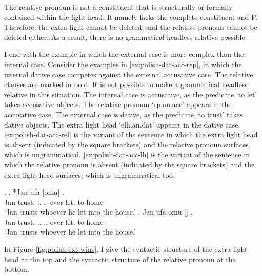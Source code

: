 The relative pronoun is not a constituent that is structurally or formally contained within the light head. It namely lacks the complete constituent and P.
Therefore, the extra light cannot be deleted, and the relative pronoun cannot be deleted either.
As a result, there is no grammatical headless relative possible.

I end with the example in which the external case is more complex than the internal case.
Consider the examples in \ref{ex:polish-dat-acc-rep}, in which the internal dative case competes against the external accusative case. The relative clauses are marked in bold. It is not possible to make a grammatical headless relative in this situation.
The internal case is accusative, as the predicate  `to let' takes accusative objects. The relative pronoun  `\ac{rp}.\ac{an}.\ac{acc}' appears in the accusative case.
The external case is dative, as the predicate  `to trust' takes dative objects. The extra light head  `\ac{elh}.\ac{an}.\ac{dat}' appears in the dative case.
\ref{ex:polish-dat-acc-rel} is the variant of the sentence in which the extra light head is absent (indicated by the square brackets) and the relative pronoun surfaces, which is ungrammatical.
\ref{ex:polish-dat-acc-lh} is the variant of the sentence in which the relative pronoun is absent (indicated by the square brackets) and the extra light head surfaces, which is ungrammatical too.

\ex.\label{ex:polish-dat-acc-rep}
\ag. *Jan ufa [omu]     .\\
Jan trust.\scsub{[dat]} .. .. ever let.\scsub{[acc]} to home\\
`Jan trusts whoever he let into the house.' \label{ex:polish-dat-acc-rel}
\bg. Jan ufa omu []    .\\
Jan trust.\scsub{[dat]} .. .. ever let.\scsub{[acc]} to home\\
`Jan trusts whoever he let into the house.' \label{ex:polish-dat-acc-lh}

In Figure \ref{fig:polish-ext-wins}, I give the syntactic structure of the extra light head at the top and the syntactic structure of the relative pronoun at the bottom.


